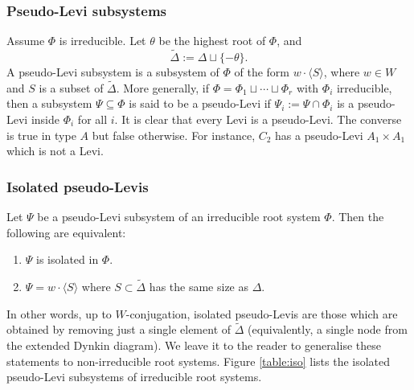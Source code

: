 \documentclass[12pt]{amsart}
\theoremstyle{plain}
\theoremstyle{definition}
\theoremstyle{remark}
\begin{document}
\subsubsection{Pseudo-Levi subsystems} Assume $\Phi$ is irreducible. Let $\theta$ be the highest root of $\Phi$, and 
\[
\widetilde \Delta:=\Delta \sqcup \{-\theta\}.
\]
 A pseudo-Levi subsystem is a subsystem of $\Phi$ of the form $w\cdot \langle S\rangle $, where $w\in W$ and $S$ is a subset of $\widetilde \Delta$.  More generally, if $\Phi=\Phi_1\sqcup \cdots \sqcup \Phi_r$ with $\Phi_i$ irreducible, then a subsystem $\Psi\subseteq \Phi$ is said to be a pseudo-Levi if $\Psi_i:=\Psi\cap \Phi_i$ is a pseudo-Levi inside $\Phi_i$ for all $i$. It is clear that every Levi is a pseudo-Levi. The converse is true in type $A$ but false otherwise. For instance, $C_2$ has a pseudo-Levi $A_1\times A_1$ which is not a Levi. 

\subsubsection{Isolated pseudo-Levis} 
 Let $\Psi$ be a pseudo-Levi subsystem of an irreducible root system $\Phi$.  Then the following are equivalent: 
\begin{enumerate} 
\item $\Psi$ is isolated in $\Phi$. 
\item $\Psi=w\cdot \langle S\rangle $ where $S\subset \tilde{\Delta}$ has the same size as $\Delta$.  
\end{enumerate} 
In other words, up to $W$-conjugation, isolated pseudo-Levis are those which are obtained by removing just a single element of $\widetilde{\Delta}$ (equivalently, a single node from the extended Dynkin diagram). We leave it to the reader to generalise these statements to non-irreducible root systems. Figure \ref{table:iso} lists the isolated pseudo-Levi subsystems of irreducible root systems.
\end{document}
